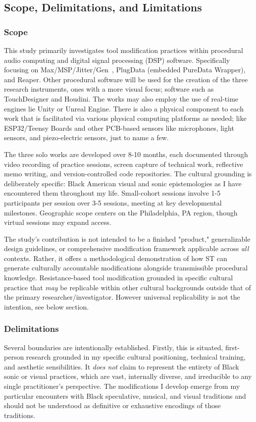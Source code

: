 \subsection{Scope, Delimitations, and Limitations}

\subsubsection{Scope}
This study primarily investigates tool modification practices within procedural audio computing and digital signal processing (DSP) software. Specifically focusing on Max/MSP/Jitter/Gen~, PlugData (embedded PureData Wrapper), and Reaper. Other procedural software will be used for the creation of the three research instruments, ones with a more visual focus; software such as TouchDesigner and Houdini. The works may also employ the use of real-time engines lie Unity or Unreal Engine. There is also a physical component to each work that is facilitated via various physical computing platforms as needed; like ESP32/Teensy Boards and other PCB-based sensors like microphones, light sensors, and piezo-electric sensors, just to name a few.

The three solo works are developed over 8-10 months, each documented through video recording of practice sessions, screen capture of technical work, reflective memo writing, and version-controlled code repositories. The cultural grounding is deliberately specific: Black American visual and sonic epistemologies as I have encountered them throughout my life. Small-cohort sessions involve 1-5 participants per session over 3-5 sessions, meeting at key developmental milestones. Geographic scope centers on the Philadelphia, PA region, though virtual sessions may expand access.

The study's contribution is not intended to be a finished "product," generalizable design guidelines, or comprehensive modification framework applicable across \textit{all} contexts. Rather, it offers a methodological demonstration of how ST can generate culturally accountable modifications alongside transmissible procedural knowledge. Resistance-based tool modification grounded in specific cultural practice that \textit{may} be replicable within other cultural backgrounds outside that of the primary researcher/investigator. However universal replicability is not the intention, see below section.
   
\subsubsection{Delimitations}
Several boundaries are intentionally established. Firstly, this is situated, first-person research grounded in my specific cultural positioning, technical training, and aesthetic sensibilities. It \textit{does not} claim to represent the entirety of Black sonic or visual practices, which are vast, internally diverse, and irreducible to any single practitioner's perspective. The modifications I develop emerge from my particular encounters with Black speculative, musical, and  visual traditions and should not be understood as definitive or exhaustive encodings of those traditions. 

